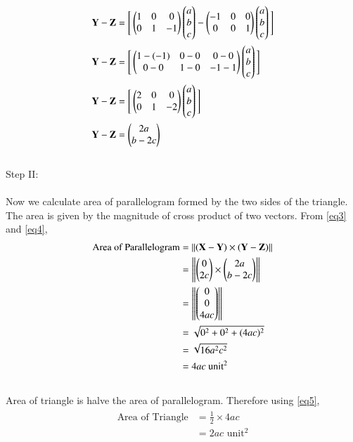 \documentclass[journal,12pt]{IEEEtran}
\begin{document}
\begin{align}
\begin{split}
\mathbf{Y-Z} & = \Bigg[\begin{pmatrix}1&0&0\\0&1&-1\end{pmatrix}\begin{pmatrix}a\\b\\c\end{pmatrix} - \begin{pmatrix}-1&0&0\\0&0&1\end{pmatrix}\begin{pmatrix}a\\b\\c\end{pmatrix}\Bigg] \\
\mathbf{Y-Z} & = \Bigg[\begin{pmatrix}1-(-1)&0-0&0-0\\0-0&1-0&-1-1\end{pmatrix}\begin{pmatrix}a\\b\\c\end{pmatrix}\Bigg] \\
\mathbf{Y-Z} & = \Bigg[\begin{pmatrix}2&0&0\\0&1&-2\end{pmatrix}\begin{pmatrix}a\\b\\c\end{pmatrix}\Bigg] \\
\mathbf{Y-Z} & = \begin{pmatrix}2a\\b-2c\end{pmatrix}
\end{split}
\label{eq4}
\end{align}\\
Step II:\\\\
Now we calculate area of parallelogram formed by the two sides of the triangle. The area is given by the magnitude of cross product of two vectors. From \ref{eq3} and \ref{eq4},\\
\begin{align}
\begin{split}
\text{Area of Parallelogram} & = \norm{\Vec{(X-Y)}\times\Vec{(Y-Z)}} \\
& = \norm{\myvec{0\\2c} \times \myvec{2a\\b-2c}} \\
& = \norm{\myvec{0\\0\\4ac}} \\
& = \sqrt{0^2 + 0^2+ (4ac)^2} \\
& = \sqrt{16a^2c^2} \\
& = 4ac \text{ unit}^2
\end{split}
\label{eq5}
\end{align}\\
Area of triangle is halve the area of parallelogram. Therefore using \ref{eq5},\\
\begin{align}
\begin{split}
\text{Area of Triangle} & = \frac{1}{2} \times 4ac \\
& = 2ac \text{ unit}^2
\end{split}
\label{eq6}
\end{align}
\end{document}
